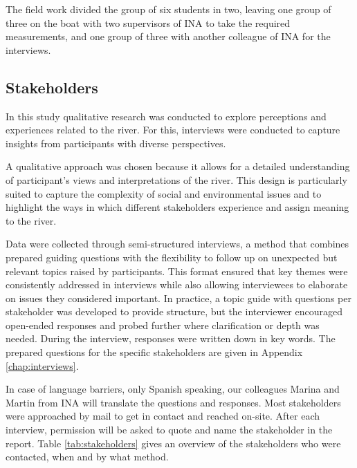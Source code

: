 The field work divided the group of six students in two, leaving one group of three on the boat with two supervisors of INA to take the required measurements, and one group of three with another colleague of INA for the interviews.

\subsection{Stakeholders}
\label{sec:stakeholder methods}
In this study qualitative research was conducted to explore perceptions and experiences related to the river. For this, interviews were conducted to capture insights from participants with diverse perspectives.

A qualitative approach was chosen because it allows for a detailed understanding of participant's views and interpretations of the river. This design is particularly suited to capture the complexity of social and environmental issues and to highlight the ways in which different stakeholders experience and assign meaning to the river.

Data were collected through semi-structured interviews, a method that combines prepared guiding questions with the flexibility to follow up on unexpected but relevant topics raised by participants. This format ensured that key themes were consistently addressed in interviews while also allowing interviewees to elaborate on issues they considered important. In practice, a topic guide with questions per stakeholder was developed to provide structure, but the interviewer encouraged open-ended responses and probed further where clarification or depth was needed. During the interview, responses were written down in key words. The prepared questions for the specific stakeholders are given in Appendix \ref{chap:interviews}.

In case of language barriers, only Spanish speaking, our colleagues Marina and Martin from INA  will translate the questions and responses. Most stakeholders were approached by mail to get in contact and reached on-site. After each interview, permission will be asked to quote and name the stakeholder in the report. Table \ref{tab:stakeholders} gives an overview of the stakeholders who were contacted, when and by what method. 

